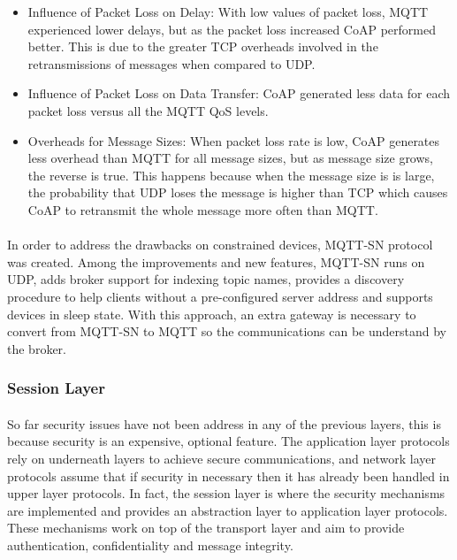 \begin{itemize}
	\item Influence of Packet Loss on Delay: With low values of packet loss, \ac{MQTT} experienced lower delays, but as the packet loss increased \ac{CoAP} performed better. This is due to the greater \ac{TCP} overheads involved in the retransmissions of messages when compared to \ac{UDP}.\\
	\item Influence of Packet Loss on Data Transfer: \ac{CoAP} generated less data for each packet loss versus all the \ac{MQTT} \ac{QoS} levels.\\
	\item Overheads for Message Sizes: When packet loss rate is low, \ac{CoAP} generates less overhead than \ac{MQTT} for all message sizes, but as message size grows, the reverse is true. This happens because when the message size is is large, the probability that \ac{UDP} loses the message is higher than \ac{TCP} which causes \ac{CoAP} to retransmit the whole message more often than \ac{MQTT}.
\end{itemize}

\paragraph{}
	In order to address the drawbacks on constrained devices, \ac{MQTT-SN} protocol\cite{Ibm2013} was created. Among the improvements and new features, \ac{MQTT-SN} runs on UDP, adds broker support for indexing topic names, provides a discovery procedure to help clients without a pre-configured server address and supports devices in sleep state. With this approach, an extra gateway is necessary to convert from \ac{MQTT-SN} to \ac{MQTT} so the communications can be understand by the broker.

\subsubsection{Session Layer}

\paragraph{}
So far security issues have not been address in any of the previous layers, this is because security is an expensive, optional feature. The application layer protocols rely on underneath layers to achieve secure communications, and network layer protocols assume that if security in necessary then it has already been handled in upper layer protocols. In fact, the session layer is where the security mechanisms are implemented and provides an abstraction layer to application layer protocols. These mechanisms work on top of the transport layer and aim to provide authentication, confidentiality and message integrity.


